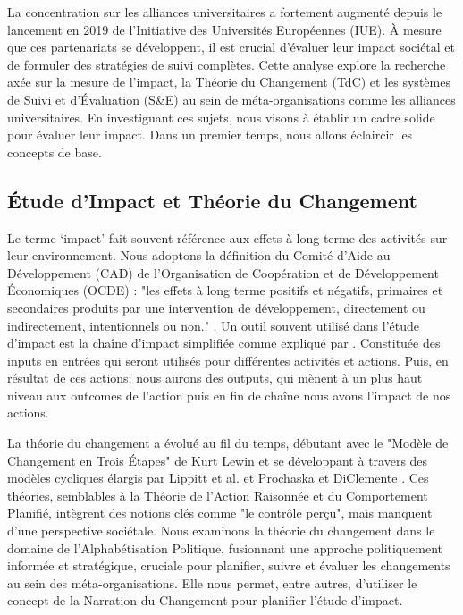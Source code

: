 La concentration sur les alliances universitaires a fortement augmenté depuis le lancement en 2019 de l'Initiative des Universités Européennes (IUE). À mesure que ces partenariats se développent, il est crucial d'évaluer leur impact sociétal et de formuler des stratégies de suivi complètes. Cette analyse explore la recherche axée sur la mesure de l'impact, la Théorie du Changement (TdC) et les systèmes de Suivi et d'Évaluation (S\&E) au sein de méta-organisations comme les alliances universitaires. En investiguant ces sujets, nous visons à établir un cadre solide pour évaluer leur impact. Dans un premier temps, nous allons éclaircir les concepts de base.

\subsection{Étude d'Impact et Théorie du Changement}
Le terme ‘impact’ fait souvent référence aux effets à long terme des activités sur leur environnement. Nous adoptons la définition du Comité d'Aide au Développement (CAD) de l’Organisation de Coopération et de Développement Économiques (OCDE) : "les effets à long terme positifs et négatifs, primaires et secondaires produits par une intervention de développement, directement ou indirectement, intentionnels ou non." \cite{oecd_quality_2010}. Un outil souvent utilisé dans l'étude d'impact est la chaîne d'impact simplifiée comme expliqué par \cite{peersman_when_2016}. Constituée des inputs en entrées qui seront utilisés pour différentes activités et actions. Puis, en résultat de ces actions; nous aurons des outputs, qui mènent à un plus haut niveau aux outcomes de l'action puis en fin de chaîne nous avons l'impact de nos actions. 

La théorie du changement a évolué au fil du temps, débutant avec le "Modèle de Changement en Trois Étapes" de Kurt Lewin \cite{lewin_frontiers_1947} et se développant à travers des modèles cycliques élargis par Lippitt et al. \cite{lippitt_dynamics_1958} et Prochaska et DiClemente \cite{prochaska_stages_1983}. Ces théories, semblables à la Théorie de l’Action Raisonnée et du Comportement Planifié, intègrent des notions clés comme "le contrôle perçu", mais manquent d'une perspective sociétale. Nous examinons la théorie du changement dans le domaine de l'Alphabétisation Politique, fusionnant une approche politiquement informée et stratégique, cruciale pour planifier, suivre et évaluer les changements au sein des méta-organisations. Elle nous permet, entre autres, d'utiliser le concept de la Narration du Changement pour planifier l'étude d'impact.

